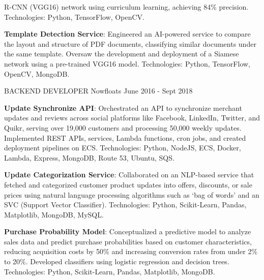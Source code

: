 \begin{cventries}
{\begin{cvitems}
{        R-CNN (VGG16) network using curriculum learning, 
        achieving 84\% precision. \newline Technologies: Python, TensorFlow, OpenCV.}      
        \item{\textbf{Template Detection Service}: Engineered an AI-powered service to compare the 
        layout and structure of PDF documents, classifying similar documents under 
        the same template. \newline Oversaw the development and deployment of a Siamese network using a pre-trained 
        VGG16 model. \newline Technologies: Python, TensorFlow, OpenCV, MongoDB.}       
	\end{cvitems}
    }
\vspace{2em} %
  \cventry
    {BACKEND DEVELOPER} %
    {Nowfloats} %
    {} %
    {June 2016 - Sept 2018} %
    {
      \begin{cvitems} %
        \item{\textbf{Update Synchronize API}: Orchestrated an API to synchronize merchant updates and reviews across social platforms like Facebook, LinkedIn, Twitter, and Quikr, serving over 19,000 customers and processing 50,000 weekly updates. \newline Implemented REST APIs, services, Lambda functions, cron jobs, and created deployment pipelines on ECS. \newline Technologies: Python, NodeJS, ECS, Docker, Lambda, Express, MongoDB, Route 53, Ubuntu, SQS.}
        \item{\textbf{Update Categorization Service}: Collaborated on an NLP-based service that fetched and categorized customer product updates into offers, discounts, or sale prices using natural language processing algorithms such as ‘bag of words’ and an SVC (Support Vector Classifier). \newline Technologies: Python, Scikit-Learn, Pandas, Matplotlib, MongoDB, MySQL.}
        \item{\textbf{Purchase Probability Model}: Conceptualized a predictive model to analyze sales data and predict purchase probabilities based on customer characteristics, reducing acquisition costs by 50\% and increasing conversion rates from under 2\% to 20\%. \newline Developed classifiers using logistic regression and decision trees. \newline Technologies: Python, Scikit-Learn, Pandas, Matplotlib, MongoDB.}
      \end{cvitems}
    }

\end{cventries}